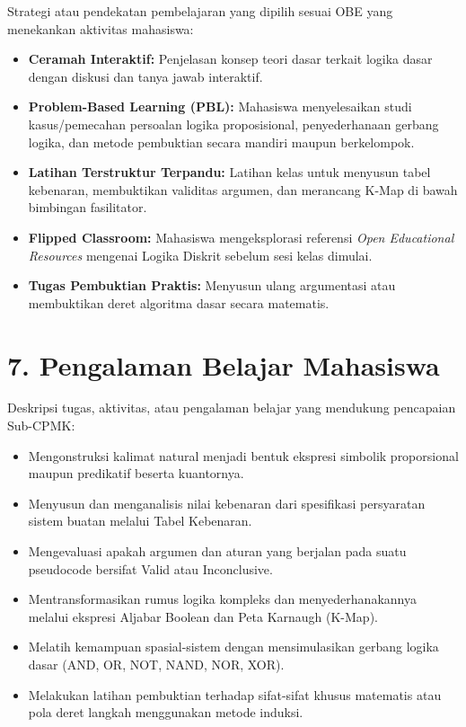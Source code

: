 \documentclass[12pt,a4paper]{article}
\begin{document}
Strategi atau pendekatan pembelajaran yang dipilih sesuai OBE yang menekankan aktivitas mahasiswa:

\begin{itemize}[leftmargin=*]
  \item \textbf{Ceramah Interaktif:} Penjelasan konsep teori dasar terkait logika dasar dengan diskusi dan tanya jawab interaktif.
  \item \textbf{Problem-Based Learning (PBL):} Mahasiswa menyelesaikan studi kasus/pemecahan persoalan logika proposisional, penyederhanaan gerbang logika, dan metode pembuktian secara mandiri maupun berkelompok.
  \item \textbf{Latihan Terstruktur Terpandu:} Latihan kelas untuk menyusun tabel kebenaran, membuktikan validitas argumen, dan merancang K-Map di bawah bimbingan fasilitator.
  \item \textbf{Flipped Classroom:} Mahasiswa mengeksplorasi referensi \textit{Open Educational Resources} mengenai Logika Diskrit sebelum sesi kelas dimulai.
  \item \textbf{Tugas Pembuktian Praktis:} Menyusun ulang argumentasi atau membuktikan deret algoritma dasar secara matematis.
\end{itemize}

\vspace{0.5cm}

\section*{7. Pengalaman Belajar Mahasiswa}

Deskripsi tugas, aktivitas, atau pengalaman belajar yang mendukung pencapaian Sub-CPMK:

\begin{itemize}[leftmargin=*]
  \item Mengonstruksi kalimat natural menjadi bentuk ekspresi simbolik proporsional maupun predikatif beserta kuantornya.
  \item Menyusun dan menganalisis nilai kebenaran dari spesifikasi persyaratan sistem buatan melalui Tabel Kebenaran.
  \item Mengevaluasi apakah argumen dan aturan yang berjalan pada suatu pseudocode bersifat Valid atau Inconclusive.
  \item Mentransformasikan rumus logika kompleks dan menyederhanakannya melalui ekspresi Aljabar Boolean dan Peta Karnaugh (K-Map).
  \item Melatih kemampuan spasial-sistem dengan mensimulasikan gerbang logika dasar (AND, OR, NOT, NAND, NOR, XOR).
  \item Melakukan latihan pembuktian terhadap sifat-sifat khusus matematis atau pola deret langkah menggunakan metode induksi.
\end{itemize}
\end{document}
